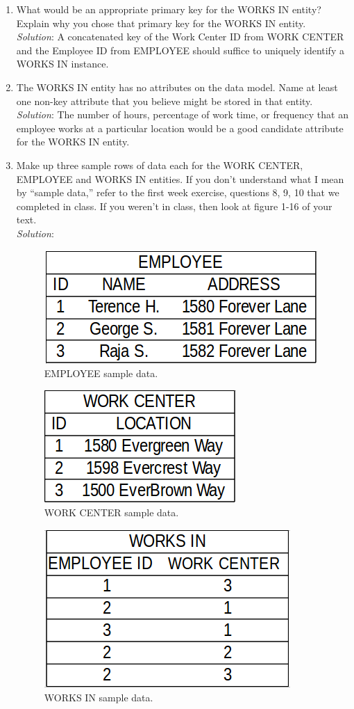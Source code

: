 \documentclass{article}
\begin{document}
\begin{enumerate}
\begin{enumerate}
		\item What would be an appropriate primary key for the WORKS IN entity? Explain why you chose that primary key for the WORKS IN entity.\\

		\textit{Solution}: A concatenated key of the Work Center ID from WORK CENTER and the Employee ID from EMPLOYEE should suffice to uniquely identify a WORKS IN instance.\\

		\item The WORKS IN entity has no attributes on the data model. Name at least one non-key attribute that you believe might be stored in that entity.\\

		\textit{Solution}: The number of hours, percentage of work time, or frequency that an employee works at a particular location would be a good candidate attribute for the WORKS IN entity.\\

		\item Make up three sample rows of data each for the WORK CENTER, EMPLOYEE and WORKS IN entities. If you don’t understand what I mean by “sample data,” refer to the first week exercise, questions 8, 9, 10 that we completed in class. If you weren’t in class, then look at figure 1-16 of your text.\\
		
  \textit{Solution}:
  \begin{figure}[h]
    \centering
    \includegraphics[width=.2\linewidth]{HW01_Part01_g1}
    \caption{EMPLOYEE sample data.}
    \label{fig:employee_sample}
  \end{figure}

  \begin{figure}[h]
    \centering
    \includegraphics[width=.15\linewidth]{HW01_Part01_g2}
    \caption{WORK CENTER sample data.}
    \label{fig:work_center_sample}
  \end{figure}
  
  \begin{figure}[h]
    \centering
    \includegraphics[width=.2\linewidth]{HW01_Part01_g3}
    \caption{WORKS IN sample data.}
    \label{fig:works_in_sample}
  \end{figure}


\end{enumerate}
\end{enumerate}
\end{document}
